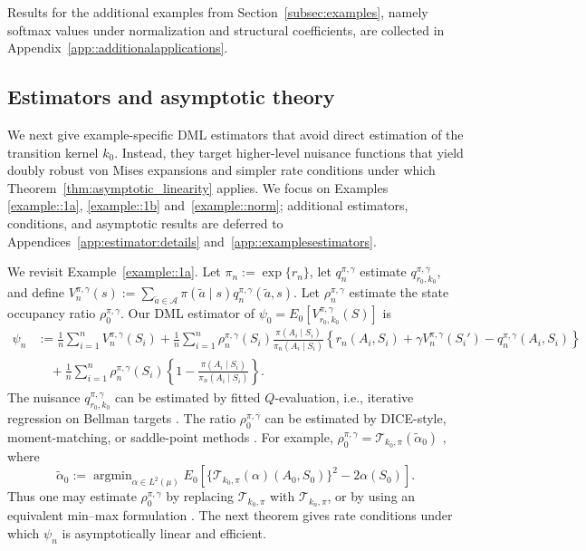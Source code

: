 \documentclass[12pt]{article}
\DeclareMathOperator*{\argmin}{argmin}
\theoremstyle{plain}
\begin{document}
Results for the additional examples from Section~\ref{subsec:examples},
namely softmax values under normalization and structural coefficients, are
collected in Appendix~\ref{app::additionalapplications}.

 



\subsection{Estimators and asymptotic theory}
\label{sec::examplesestimators}

We next give example-specific DML estimators that avoid direct estimation of
the transition kernel \(k_0\). Instead, they target higher-level nuisance
functions that yield doubly robust von Mises expansions and simpler rate
conditions under which Theorem~\ref{thm:asymptotic_linearity} applies. We focus
on Examples~ \ref{example::1a}, \ref{example::1b} and~\ref{example::norm}; additional estimators,
conditions, and asymptotic results are deferred to
Appendices~\ref{app:estimator:details} and~\ref{app::examplesestimators}.


We revisit Example~\ref{example::1a}. Let \(\pi_n:=\exp\{r_n\}\), let
\(q_n^{\pi,\gamma}\) estimate \(q_{r_0,k_0}^{\pi,\gamma}\), and define
\(V_n^{\pi,\gamma}(s):=\sum_{\tilde a\in\mathcal A}\pi(\tilde a\mid s)
q_n^{\pi,\gamma}(\tilde a,s)\). Let \(\rho_n^{\pi,\gamma}\) estimate the state
occupancy ratio \(\rho_0^{\pi,\gamma}\). Our DML estimator of
\(\psi_0=E_0[V_{r_0,k_0}^{\pi,\gamma}(S)]\) is
\begin{align*}
\psi_n
&:= \frac{1}{n}\sum_{i=1}^n V_n^{\pi,\gamma}(S_i)
  + \frac{1}{n}\sum_{i=1}^n
  \rho_n^{\pi,\gamma}(S_i)
  \frac{\pi(A_i\mid S_i)}{\pi_n(A_i\mid S_i)}
  \left\{
  r_n(A_i,S_i)+\gamma V_n^{\pi,\gamma}(S_i')
  -q_n^{\pi,\gamma}(A_i,S_i)
  \right\} \\
&\quad
  + \frac{1}{n}\sum_{i=1}^n
  \rho_n^{\pi,\gamma}(S_i)
  \left\{
  1-\frac{\pi(A_i\mid S_i)}{\pi_n(A_i\mid S_i)}
  \right\}.
\end{align*}
The nuisance \(q_{r_0,k_0}^{\pi,\gamma}\) can be estimated by fitted
\(Q\)-evaluation, i.e., iterative regression on Bellman targets
\citep{ernst2005tree,munos2005error,riedmiller2005neural,munos2008finite,mnih2013playing,van2025fitted}.
The ratio \(\rho_0^{\pi,\gamma}\) can be estimated by DICE-style,
moment-matching, or saddle-point methods
\citep{liu2018breaking,uehara2020minimax,nachum2019dualdice,zhang2020gendice,wang2023projected,van2025automaticDRL}.
For example, \(\rho_0^{\pi,\gamma}=\mathcal T_{k_0,\pi}(\widetilde\alpha_0)\)
\citep{van2025automaticDRL}, where
\[
\widetilde\alpha_0
:=
\argmin_{\alpha\in L^2(\mu)}
E_0\!\left[
\{\mathcal T_{k_0,\pi}(\alpha)(A_0,S_0)\}^2
-2\alpha(S_0)
\right].
\]
Thus one may estimate \(\rho_0^{\pi,\gamma}\) by replacing
\(\mathcal T_{k_0,\pi}\) with \(\mathcal T_{k_n,\pi}\), or by using an
equivalent min--max formulation
\citep{liu2018breaking,uehara2020minimax,dikkala2020minimax,kallus2020double}.
The next theorem gives rate conditions under which \(\psi_n\) is asymptotically
linear and efficient.
\end{document}
